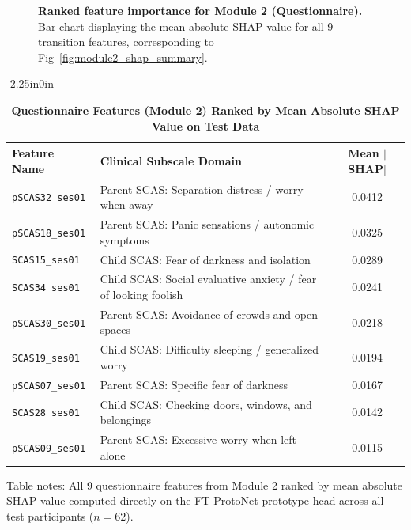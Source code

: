 \documentclass[10pt,letterpaper]{article}
\begin{document}
\begin{figure}[!h]
\caption{\textbf{Ranked feature importance for Module 2 (Questionnaire).}
Bar chart displaying the mean absolute SHAP value for all 9 transition features, corresponding to Fig~\ref{fig:module2_shap_summary}.}
\label{fig:module2_bar}
\end{figure}

\begin{table}[!t]
\begin{adjustwidth}{-2.25in}{0in}
\centering
\caption{\textbf{Questionnaire Features (Module 2) Ranked by Mean Absolute SHAP Value on Test Data}}
\label{tab:module2_shap}
\footnotesize
\renewcommand{\arraystretch}{1.2}
\begin{tabular}{|l|l|c|}
\hline
\textbf{Feature Name} & \textbf{Clinical Subscale Domain} & \textbf{Mean $|$SHAP$|$} \\
\hline
\texttt{pSCAS32\_ses01} & Parent SCAS: Separation distress / worry when away & 0.0412 \\
\hline
\texttt{pSCAS18\_ses01} & Parent SCAS: Panic sensations / autonomic symptoms & 0.0325 \\
\hline
\texttt{SCAS15\_ses01} & Child SCAS: Fear of darkness and isolation & 0.0289 \\
\hline
\texttt{SCAS34\_ses01} & Child SCAS: Social evaluative anxiety / fear of looking foolish & 0.0241 \\
\hline
\texttt{pSCAS30\_ses01} & Parent SCAS: Avoidance of crowds and open spaces & 0.0218 \\
\hline
\texttt{SCAS19\_ses01} & Child SCAS: Difficulty sleeping / generalized worry & 0.0194 \\
\hline
\texttt{pSCAS07\_ses01} & Parent SCAS: Specific fear of darkness & 0.0167 \\
\hline
\texttt{SCAS28\_ses01} & Child SCAS: Checking doors, windows, and belongings & 0.0142 \\
\hline
\texttt{pSCAS09\_ses01} & Parent SCAS: Excessive worry when left alone & 0.0115 \\
\hline
\end{tabular}
\begin{flushleft}
Table notes: All 9 questionnaire features from Module 2 ranked by mean absolute SHAP value computed directly on the FT-ProtoNet prototype head across all test participants ($n=62$).
\end{flushleft}
\end{adjustwidth}
\end{table}
\end{document}

